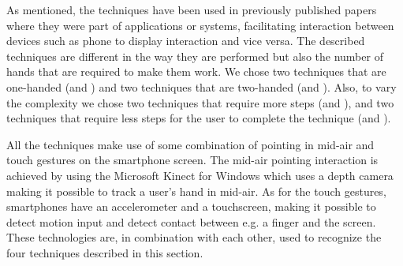As mentioned, the techniques have been used in previously published papers where they were part of applications or systems, facilitating interaction between devices such as phone to display interaction and vice versa. 
The described techniques are different in the way they are performed but also the number of hands that are required to make them work.
We chose two techniques that are one-handed (\swipe and \tilt) and two techniques that are two-handed (\throw and \pinch).
Also, to vary the complexity we chose two techniques that require more steps (\throw and \pinch), and two techniques that require less steps for the user to complete the technique (\swipe and \tilt).

All the techniques make use of some combination of pointing in mid-air and touch gestures on the smartphone screen.
The mid-air pointing interaction is achieved by using the Microsoft Kinect for Windows which uses a depth camera making it possible to track a user's hand in mid-air.
As for the touch gestures, smartphones have an accelerometer and a touchscreen, making it possible to detect motion input and detect contact between e.g. a finger and the screen.
These technologies are, in combination with each other, used to recognize the four techniques described in this section. 